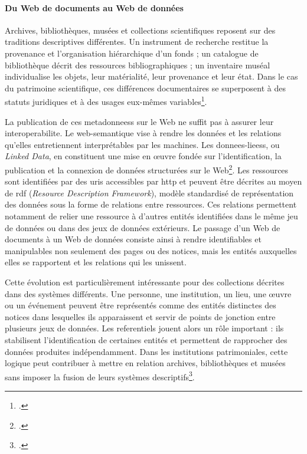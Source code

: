 \paragraph{Du Web de documents au Web de données}

Archives, bibliothèques, musées et collections scientifiques reposent sur des traditions descriptives différentes. Un instrument de recherche restitue la provenance et l'organisation hiérarchique d'un fonds ; un catalogue de bibliothèque décrit des ressources bibliographiques ; un inventaire muséal individualise les objets, leur matérialité, leur provenance et leur état. Dans le cas du patrimoine scientifique, ces différences documentaires se superposent à des statuts juridiques et à des usages eux-mêmes variables\footcite{Cornu2016}.

La publication de ces \glspl{metadonnees} sur le Web ne suffit pas à assurer leur \gls{interoperabilite}. Le \gls{web-semantique} vise à rendre les données et les relations qu'elles entretiennent interprétables par les machines. Les \glspl{donnees-liees}, ou \emph{Linked Data}, en constituent une mise en œuvre fondée sur l'identification, la publication et la connexion de données structurées sur le Web\footcite{BizerHeathBernersLee2009}. Les ressources sont identifiées par des \glspl{uri} accessibles par \gls{http} et peuvent être décrites au moyen de \gls{rdf} (\emph{Resource Description Framework}), modèle standardisé de représentation des données sous la forme de relations entre ressources. Ces relations permettent notamment de relier une ressource à d'autres entités identifiées dans le même jeu de données ou dans des jeux de données extérieurs. Le passage d'un Web de documents à un Web de données consiste ainsi à rendre identifiables et manipulables non seulement des pages ou des notices, mais les entités auxquelles elles se rapportent et les relations qui les unissent.

Cette évolution est particulièrement intéressante pour des collections décrites dans des systèmes différents. Une personne, une institution, un lieu, une œuvre ou un événement peuvent être représentés comme des entités distinctes des notices dans lesquelles ils apparaissent et servir de points de jonction entre plusieurs jeux de données. Les \glspl{referentiel} jouent alors un rôle important : ils stabilisent l'identification de certaines entités et permettent de rapprocher des données produites indépendamment. Dans les institutions patrimoniales, cette logique peut contribuer à mettre en relation archives, bibliothèques et musées sans imposer la fusion de leurs systèmes descriptifs\footcite{Marcondes2012LinkedData}.



